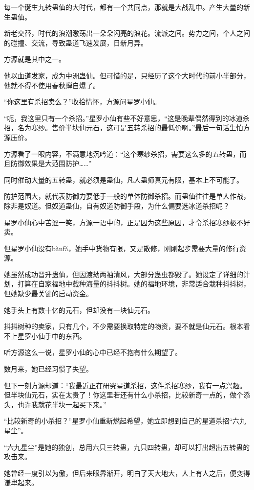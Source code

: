 \begin{this_body}
每一个诞生九转蛊仙的大时代，都有一个共同点，那就是大战乱中。产生大量的新生蛊仙。

新老交替，时代的浪潮激荡出一朵朵闪亮的浪花。流派之间。势力之间，个人之间的碰撞、交流，导致蛊道飞速发展，日新月异。

方源就是其中之一。

他以血道发家，成为中洲蛊仙。但可惜的是，只经历了这个大时代的前小半部分，他就不得不使用春秋蝉自爆了。

“你这里有杀招卖么？”收拾情怀，方源问星罗小仙。

“呃，我这里只有一个杀招。”星罗小仙有些不好意思，“这是晚辈偶然得到的冰道杀招，名为寒纱。售价半块仙元石，这可是五转杀招的最低价啊。”最后一句话生怕方源压价。

方源看了一眼内容，不满意地沉吟道：“这个寒纱杀招，需要这么多的五转蛊，而且防御效果是大范围防护……”

同时催动大量的五转蛊，就必须是蛊仙，凡人蛊师真元有限，基本上不可能了。

防护范围大，就代表防御力要低于一般的单体防御杀招。而蛊仙往往是单人作战，除非是奴道。但奴道蛊仙，自有奴道防御手段，为什么偏要选冰道杀招呢？

星罗小仙心中苦涩一笑，方源一语中的，正是因为这些原因，才令杀招寒纱极不好卖。

但星罗小仙没有bànfǎ，她手中货物有限，又是散修，刚刚起步需要大量的修行资源。

她虽然成功晋升蛊仙，但因渡劫两袖清风，大部分蛊虫都毁了。她设定了详细的计划，打算在自家福地中载种海量的抖抖树。她的福地环境，非常适合栽种抖抖树，但她缺少最关键的启动资金。

她手头上有数十亿的元石，但却没有一块仙元石。

抖抖树种的卖家，只有几个，不少需要换取特定的物资，要不就是仙元石。根本看不上星罗小仙手中的东西。

听方源这么一说，星罗小仙的心中已经不抱有什么期望了。

数月来，她已经习惯了失望。

但下一刻方源却道：“我最近正在研究星道杀招，这件杀招寒纱，我有一点兴趣。但半块仙元石，实在太贵了！你这里若还有什么小杀招，比较新奇一点的，做个添头，也许我就花半块一起买下来。”

“比较新奇的小杀招？”星罗小仙重新燃起希望，她立即想到自己的星道杀招“六九星尘”。

“六九星尘”是她的独创，总用六只三转蛊，九只四转蛊，却可以打出超出五转蛊的攻击来。

她曾经一度引以为傲，但后来眼界渐开，明白了天大地大，人上有人之后，便变得谦卑起来。


\end{this_body}
